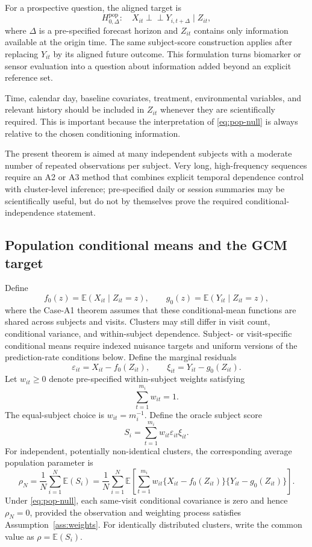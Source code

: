 \documentclass[11pt]{article}
\theoremstyle{definition}
\newcommand{\indep}{\perp\!\!\!\perp}
\newcommand{\E}{\mathbb{E}}
\begin{document}
For a prospective question, the aligned target is
\begin{equation}
H_{0,\Delta}^{\mathrm{pop}}:\quad
X_{it}\indep Y_{i,t+\Delta}\mid Z_{it},
\label{eq:prospective-null}
\end{equation}
where $\Delta$ is a pre-specified forecast horizon and $Z_{it}$ contains only information
available at the origin time. The same subject-score construction applies after replacing
$Y_{it}$ by its aligned future outcome. This formulation turns biomarker or sensor evaluation
into a question about information added beyond an explicit reference set.

Time, calendar day, baseline covariates, treatment, environmental variables, and relevant
history should be included in $Z_{it}$ whenever they are scientifically required. This is
important because the interpretation of \eqref{eq:pop-null} is always relative to the chosen
conditioning information.

The present theorem is aimed at many independent subjects with a moderate number of repeated
observations per subject. Very long, high-frequency sequences require an A2 or A3 method that
combines explicit temporal dependence control with cluster-level inference; pre-specified
daily or session summaries may be scientifically useful, but do not by themselves prove the
required conditional-independence statement.

\subsection{Population conditional means and the GCM target}

Define
\[
f_0(z)=\E(X_{it}\mid Z_{it}=z),
\qquad
g_0(z)=\E(Y_{it}\mid Z_{it}=z),
\]
where the Case-A1 theorem assumes that these conditional-mean functions are shared across
subjects and visits. Clusters may still differ in visit count, conditional variance, and
within-subject dependence. Subject- or visit-specific conditional means require indexed
nuisance targets and uniform versions of the prediction-rate conditions below. Define the
marginal residuals
\[
\varepsilon_{it}=X_{it}-f_0(Z_{it}),
\qquad
\xi_{it}=Y_{it}-g_0(Z_{it}).
\]
Let $w_{it}\geq 0$ denote pre-specified within-subject weights satisfying
\[
\sum_{t=1}^{m_i}w_{it}=1.
\]
The equal-subject choice is $w_{it}=m_i^{-1}$. Define the oracle subject score
\begin{equation}
S_i=\sum_{t=1}^{m_i}w_{it}\varepsilon_{it}\xi_{it}.
\label{eq:oracle-score}
\end{equation}
For independent, potentially non-identical clusters, the corresponding average population
parameter is
\begin{equation}
\rho_N=\frac1N\sum_{i=1}^N\E(S_i)
=\frac1N\sum_{i=1}^N\E\left[\sum_{t=1}^{m_i}w_{it}
\{X_{it}-f_0(Z_{it})\}\{Y_{it}-g_0(Z_{it})\}\right].
\label{eq:rho}
\end{equation}
Under \eqref{eq:pop-null}, each same-visit conditional covariance is zero and hence
$\rho_N=0$, provided the observation and weighting process satisfies
Assumption~\ref{ass:weights}. For identically distributed clusters, write the common value as
$\rho=\E(S_i)$.
\end{document}
